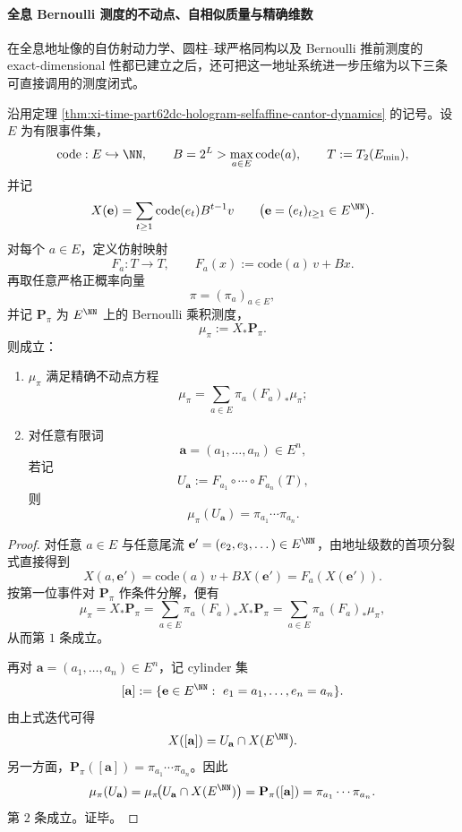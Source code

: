 \paragraph{全息 Bernoulli 测度的不动点、自相似质量与精确维数}
在全息地址像的自仿射动力学、圆柱--球严格同构以及 Bernoulli 推前测度的 exact-dimensional 性都已建立之后，还可把这一地址系统进一步压缩为以下三条可直接调用的测度闭式。

\begin{proposition}\label{prop:xi-time-part62dca-hologram-affine-ifs-fixedpoint-equation}
沿用定理 \ref{thm:xi-time-part62dc-hologram-selfaffine-cantor-dynamics} 的记号。设 \(E\) 为有限事件集，
\[
\mathrm{code}:E\hookrightarrow \NN,
\qquad
B=2^L>\max_{a\in E}\mathrm{code}(a),
\qquad
T:=T_2(E_{\min}),
\]
并记
\[
X(\mathbf e)=\sum_{t\ge 1}\mathrm{code}(e_t)B^{t-1}v
\qquad
\bigl(\mathbf e=(e_t)_{t\ge 1}\in E^{\NN}\bigr).
\]
对每个 \(a\in E\)，定义仿射映射
\[
F_a:T\longrightarrow T,
\qquad
F_a(x):=\mathrm{code}(a)\,v+B x.
\]
再取任意严格正概率向量
\[
\pi=(\pi_a)_{a\in E},
\]
并记 \(\mathbf P_\pi\) 为 \(E^{\NN}\) 上的 Bernoulli 乘积测度，
\[
\mu_\pi:=X_*\mathbf P_\pi.
\]
则成立：
\begin{enumerate}
  \item \(\mu_\pi\) 满足精确不动点方程
        \[
        \mu_\pi=\sum_{a\in E}\pi_a\,(F_a)_*\mu_\pi;
        \]
  \item 对任意有限词
        \[
        \mathbf a=(a_1,\dots,a_n)\in E^n,
        \]
        若记
        \[
        U_{\mathbf a}:=F_{a_1}\circ\cdots\circ F_{a_n}(T),
        \]
        则
        \[
        \mu_\pi(U_{\mathbf a})=\pi_{a_1}\cdots \pi_{a_n}.
        \]
\end{enumerate}
\end{proposition}
\begin{proof}
对任意 \(a\in E\) 与任意尾流 \(\mathbf e'=(e_2,e_3,\dots)\in E^{\NN}\)，由地址级数的首项分裂式直接得到
\[
X(a,\mathbf e')
=
\mathrm{code}(a)\,v+B X(\mathbf e')
=
F_a(X(\mathbf e')).
\]
按第一位事件对 \(\mathbf P_\pi\) 作条件分解，便有
\[
\mu_\pi
=
X_*\mathbf P_\pi
=
\sum_{a\in E}\pi_a\,(F_a)_*X_*\mathbf P_\pi
=
\sum_{a\in E}\pi_a\,(F_a)_*\mu_\pi,
\]
从而第 \(1\) 条成立。

再对 \(\mathbf a=(a_1,\dots,a_n)\in E^n\)，记 cylinder 集
\[
[\mathbf a]
:=
\{\mathbf e\in E^{\NN}:\ e_1=a_1,\dots,e_n=a_n\}.
\]
由上式迭代可得
\[
X([\mathbf a])=U_{\mathbf a}\cap X(E^{\NN}).
\]
另一方面，\(\mathbf P_\pi([\mathbf a])=\pi_{a_1}\cdots \pi_{a_n}\)。因此
\[
\mu_\pi(U_{\mathbf a})
=
\mu_\pi\!\bigl(U_{\mathbf a}\cap X(E^{\NN})\bigr)
=
\mathbf P_\pi([\mathbf a])
=
\pi_{a_1}\cdots \pi_{a_n}.
\]
第 \(2\) 条成立。证毕。
\end{proof}

